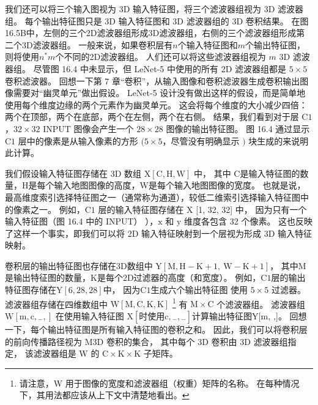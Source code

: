 我们还可以将三个输入图视为 3D 输入特征图，将三个滤波器组视为 3D 滤波器组。 
每个输出特征图只是 $3 \mathrm{D}$ 输入特征图和 $3 \mathrm{D}$ 滤波器组的 3D 卷积结果。 
在图16.5B中，左侧的三个2D滤波器组形成3D滤波器组，右侧的三个滤波器组形成第二个3D滤波器组。 
一般来说，如果卷积层有$n$个输入特征图和$m$个输出特征图，则将使用$n^{*} m$个不同的2D滤波器组。 
人们还可以将这些滤波器组视为 $m$ 3D 滤波器组。 
尽管图 16.4 中未显示，但 LeNet-5 中使用的所有 2D 滤波器组都是 $5 \times 5$ 卷积滤波器。 
回想一下第 7 章“卷积”，从输入图像和卷积滤波器生成卷积输出图像需要对“幽灵单元”做出假设。 
LeNet-5 设计没有做出这样的假设，而是简单地使用每个维度边缘的两个元素作为幽灵单元。 
这会将每个维度的大小减少四倍：两个在顶部，两个在底部，两个在左侧，两个在右侧。 
结果，我们看到对于层 $\mathrm{C} 1$，$32 \times 32$ INPUT 图像会产生一个 $28 \times 28$ 图像的输出特征图。 
图 16.4 通过显示 $\mathrm{C} 1$ 层中的像素是从输入像素的方形 $(5 \times 5$，尽管没有明确显示 $)$ 块生成的来说明此计算。

我们假设输入特征图存储在 $3 \mathrm{D}$ 数组 $\mathrm{X}[\mathrm{C}, \mathrm{H}, \mathrm{W}]$ 中，
其中 $\mathrm {C}$是输入特征图的数量，$\mathrm{H}$是每个输入地图图像的高度，$\mathrm{W}$是每个输入地图图像的宽度。 
也就是说，最高维度索引选择特征图之一（通常称为通道），较低二维索引选择输入特征图中的像素之一。 
例如，$\mathrm{C} 1$ 层的输入特征图存储在 $\mathrm{X}$ [1, 32, 32] 中，
因为只有一个输入特征图（图 16.4 中的 INPUT） ），$\mathrm{x}$ 和 $\mathrm{y}$ 维度各包含 32 个像素。 
这也反映了这样一个事实，即我们可以将 2D 输入特征映射到一个层视为形成 3D 输入特征映射。

卷积层的输出特征图也存储在3D数组中 $\mathrm{Y}[\mathrm{M}, \mathrm{H}-\mathrm{K}+1, \mathrm{~W}-\mathrm{K}+1]$，
其中$\mathrm{M}$是输出特征图的数量，$\mathrm{K}$是每个$2\mathrm{D}$过滤器的高度（和宽度）。 
例如，$\mathrm{C} 1$层的输出特征图存储在$\mathrm{Y}[6,28,28]$中，
因为$\mathrm{C} 1$生成六个输出特征图 使用 $5 \times 5$ 过滤器。 
滤波器组存储在四维数组中 $\mathrm{W}[\mathrm{M}, \mathrm{C}, \mathrm{K}, \mathrm{K}]$
\footnote{请注意，W 用于图像的宽度和滤波器组（权重）矩阵的名称。 在每种情况下，其用法都应该从上下文中清楚地看出。} 
有 $\mathrm{M} \times \mathrm{C}$ 个滤波器组。 
滤波器组 $\mathrm{W}\left[\mathrm{m}, \mathrm{c},{ }_{-},\right]$
在使用输入特征图 $\mathrm{X}\left[ 时使用 \mathrm{c},{ }_{-},{ }_{-}\right]$计算输出特征图$\mathrm{Y}[\mathrm{m}$, \textit{,}]。 
回想一下，每个输出特征图是所有输入特征图的卷积之和。 
因此，我们可以将卷积层的前向传播路径视为 $\mathrm{M} 3 \mathrm{D}$ 卷积的集合，
其中每个 3D 卷积由 $3 \mathrm{D}$ 滤波器组指定，
该滤波器组是 $\mathrm{W}$ 的 $\mathrm{C} \times \mathrm{K} \times \mathrm{K}$ 子矩阵。

